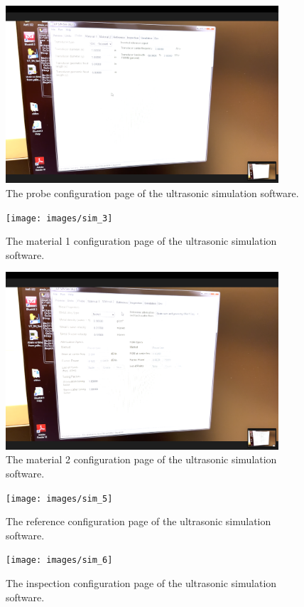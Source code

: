 \documentclass[12 pt]{report}
\begin{document}
\begin{figure}[htbp]
	\centering
	\includegraphics[width=4in]{images/sim_2}
	\caption{The probe configuration page of the ultrasonic simulation software.}
	\label{fig:sim_2}
\end{figure}

\begin{figure}[htbp]
	\centering
	\texttt{[image: images/sim\_3]}
	\caption{The material \num{1} configuration page of the ultrasonic simulation software.}
	\label{fig:sim_3}
\end{figure}

\begin{figure}[htbp]
	\centering
	\includegraphics[width=4in]{images/sim_4}
	\caption{The material \num{2} configuration page of the ultrasonic simulation software.}
	\label{fig:sim_4}
\end{figure}

\begin{figure}[htbp]
	\centering
	\texttt{[image: images/sim\_5]}
	\caption{The reference configuration page of the ultrasonic simulation software.}
	\label{fig:sim_5}
\end{figure}

\begin{figure}[htbp]
	\centering
	\texttt{[image: images/sim\_6]}
	\caption{The inspection configuration page of the ultrasonic simulation software.}
	\label{fig:sim_6}
\end{figure}
\end{document}
